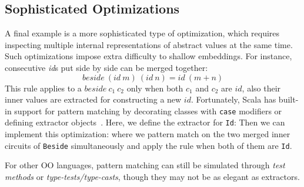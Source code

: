 \subsection{Sophisticated Optimizations}
A final example is a more sophisticated type of optimization, 
which requires inspecting multiple internal
representations of abstract values at the same time.
Such optimizations impose extra difficulty to shallow
embeddings.
For instance, consecutive \emph{id}s put side by side can be merged together:
$$
beside\ (id\ m)\ (id\ n) = id\ (m + n)
$$
This rule applies to a $beside\ c_1\ c_2$ only when both $c_1$ and $c_2$ are
$id$, also their inner values are extracted for constructing a new $id$.
Fortunately, Scala has built-in support for pattern matching by decorating
classes with \lstinline{case} modifiers or defining extractor objects~\cite{emir2007matching}.
Here, we define the extractor for \lstinline{Id}:
Then we can implement this optimization:
where we pattern match on the two merged inner circuits of \lstinline{Beside}
simultaneously and apply the rule when both of them are \lstinline{Id}.

For other OO languages, pattern matching can still be simulated through \emph{test methods} or \emph{type-tests/type-casts},
though they may not be as elegant as extractors.

